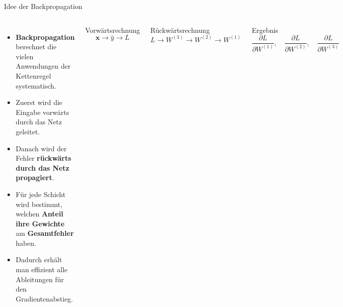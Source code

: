 \begin{frame}{Idee der Backpropagation}
\footnotesize
\begin{columns}

\begin{itemize}
    \item \textbf{Backpropagation} berechnet die vielen Anwendungen der
          Kettenregel systematisch.

    \item Zuerst wird die Eingabe vorwärts durch das Netz geleitet.

    \item Danach wird der Fehler \textbf{rückwärts durch das Netz propagiert}.

    \item Für jede Schicht wird bestimmt, welchen \textbf{Anteil ihre Gewichte} am
          \textbf{Gesamtfehler} haben.

    \item Dadurch erhält man effizient alle Ableitungen für den
          Gradientenabstieg.
\end{itemize}


\begin{block}{\footnotesize Vorwärtsrechnung}
\[
    \mathbf{x}
    \longrightarrow
    \hat{y}
    \longrightarrow
    L
\]
\end{block}

\vspace{0.3cm}

\begin{blockC2}{\footnotesize Rückwärtsrechnung}
\[
    L
    \longrightarrow
    W^{(3)}
    \longrightarrow
    W^{(2)}
    \longrightarrow
    W^{(1)}
\]
\end{blockC2}

\vspace{0.3cm}

\begin{block}{\footnotesize Ergebnis}
\[
    \frac{\partial L}{\partial W^{(1)}},
    \quad
    \frac{\partial L}{\partial W^{(2)}},
    \quad
    \frac{\partial L}{\partial W^{(3)}}
\]
\end{block}

\end{columns}

\end{frame}

